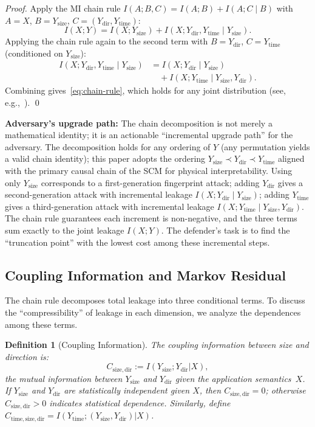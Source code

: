 \documentclass[lettersize,journal]{IEEEtran}
\newtheorem{definition}{Definition}
\begin{document}
\begin{proof}
Apply the MI chain rule $I(A;B,C) = I(A;B) + I(A;C\mid B)$ with
$A=X$, $B=Y_{\mathrm{size}}$, $C=(Y_{\mathrm{dir}}, Y_{\mathrm{time}})$:
\[
I(X;Y) = I(X;Y_{\mathrm{size}}) + I(X;Y_{\mathrm{dir}},Y_{\mathrm{time}}\mid Y_{\mathrm{size}}).
\]
Applying the chain rule again to the second term with $B=Y_{\mathrm{dir}}$,
$C=Y_{\mathrm{time}}$ (conditioned on $Y_{\mathrm{size}}$):
\begin{align*}
I(X;Y_{\mathrm{dir}},Y_{\mathrm{time}}\mid Y_{\mathrm{size}})
  &= I(X;Y_{\mathrm{dir}}\mid Y_{\mathrm{size}})\\
  &\quad + I(X;Y_{\mathrm{time}}\mid Y_{\mathrm{size}},Y_{\mathrm{dir}}).
\end{align*}
Combining gives~\eqref{eq:chain-rule}, which holds for any joint
distribution (see, e.g.,~\cite{cover2006elements}). \qed
\end{proof}

\textbf{Adversary's upgrade path:} The chain decomposition is not merely a
mathematical identity; it is an actionable ``incremental upgrade path'' for
the adversary.
The decomposition holds for any ordering of $Y$ (any permutation yields a
valid chain identity); this paper adopts the ordering
$Y_{\mathrm{size}}\prec Y_{\mathrm{dir}}\prec Y_{\mathrm{time}}$
aligned with the primary causal chain of the SCM for physical
interpretability.
Using only $Y_{\mathrm{size}}$ corresponds to a first-generation fingerprint
attack; adding $Y_{\mathrm{dir}}$ gives a second-generation attack with
incremental leakage $I(X;Y_{\mathrm{dir}}\mid Y_{\mathrm{size}})$;
adding $Y_{\mathrm{time}}$ gives a third-generation attack with incremental
leakage $I(X;Y_{\mathrm{time}}\mid Y_{\mathrm{size}},Y_{\mathrm{dir}})$.
The chain rule guarantees each increment is non-negative, and the three
terms sum exactly to the joint leakage $I(X;Y)$.
The defender's task is to find the ``truncation point'' with the lowest cost
among these incremental steps.

\subsection{Coupling Information and Markov Residual}\label{sec:coupling}

The chain rule decomposes total leakage into three conditional terms.
To discuss the ``compressibility'' of leakage in each dimension, we
analyze the dependences among these terms.

\begin{definition}[Coupling Information]\label{def:coupling}
The coupling information between size and direction is:
\[
C_{\mathrm{size,dir}} := I(Y_{\mathrm{size}};Y_{\mathrm{dir}}|X),
\]
the mutual information between $Y_{\mathrm{size}}$ and $Y_{\mathrm{dir}}$
given the application semantics~$X$.
If $Y_{\mathrm{size}}$ and $Y_{\mathrm{dir}}$ are statistically
independent given $X$, then $C_{\mathrm{size,dir}} = 0$; otherwise
$C_{\mathrm{size,dir}} > 0$ indicates statistical dependence.
Similarly, define $C_{\mathrm{time,size,dir}} = I(Y_{\mathrm{time}};(Y_{\mathrm{size}},Y_{\mathrm{dir}})|X)$.
\end{definition}
\end{document}
